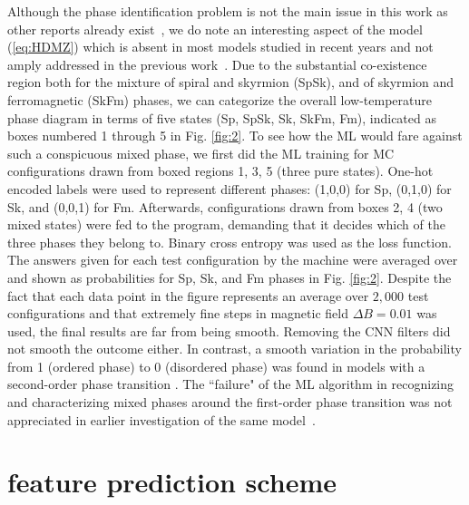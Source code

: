 \documentclass[reprint,amsmath,amssymb,aps,showpacs,superscriptaddress,prb]{revtex4-1}
\begin{document}
Although the phase identification problem is not the main issue in this work as other reports already exist~\cite{russian18}, we do note an interesting aspect of the model (\ref{eq:HDMZ}) which is absent in most models studied in recent years and not amply addressed in the previous work~\cite{russian18}. Due to the substantial co-existence region both for the mixture of spiral and skyrmion (SpSk), and of skyrmion and ferromagnetic (SkFm) phases, we can categorize the overall low-temperature phase diagram in terms of five states (Sp, SpSk, Sk, SkFm, Fm), indicated as boxes numbered 1 through 5 in Fig. \ref{fig:2}. To see how the ML would fare against such a conspicuous mixed phase, we first did the ML training for MC configurations drawn from boxed regions 1, 3, 5 (three pure states). One-hot encoded labels were used to represent different phases: (1,0,0) for Sp, (0,1,0) for Sk, and (0,0,1) for Fm. Afterwards, configurations drawn from boxes 2, 4 (two mixed states) were fed to the program, demanding that it decides which of the three phases they belong to. Binary cross entropy was used as the loss function. The answers given for each test configuration by the machine were averaged over and shown as probabilities for Sp, Sk, and Fm phases  in Fig. \ref{fig:2}. Despite the fact that each data point in the figure represents an average over $2,000$ test configurations and that extremely fine steps in magnetic field $\Delta B= 0.01$ was used, the final results are far from being smooth. Removing the CNN filters did not smooth the outcome either. In contrast, a smooth variation in the probability from 1 (ordered phase) to 0 (disordered phase) was found in models with a second-order phase transition \cite{wang16,melko17,tanaka17,scalettar17,wetzel17,kim18,zhai17,scalettar17,beach18}.
The ``failure" of the ML algorithm in recognizing and characterizing mixed phases around the first-order phase transition was not appreciated in earlier investigation of the same model~\cite{russian18}.


\section{feature prediction scheme}
\end{document}
